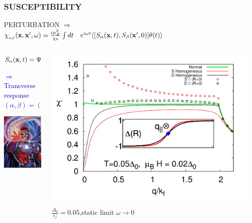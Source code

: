 \documentclass[amssymb,amsmath]{beamer}
\newcommand{\blue}{\textcolor{blue}}
\newcommand{\red}{\textcolor{red}}
\newcommand\Fontvi{\fontsize{9}{9}\selectfont}
\begin{document}
\begin{frame} \frametitle{SUSCEPTIBILITY} 
PERTURBATION $\Rightarrow\,\,$  \\
$\chi_{_{\alpha\beta}}({\bf x},{\bf x}',\omega) = \frac{i\mu_B^2}{\chi_0}\int dt \quad e^{i\omega t}\langle [S_\alpha({\bf x},t), S_\beta({\bf x}',0)]\theta(t) \rangle$
\begin{columns}
\begin{column}{0.42\textwidth}
$S_\alpha({\bf x},t) = \Psi^\dagger_\mu({\bf x},t) \sigma^{\alpha}_{\mu\nu}  \Psi^\dagger_\nu({\bf x},t)$

\blue{\Fontvi $\Rightarrow$Transverse response \\\hspace{1cm}$(\alpha,\beta) = (x,x)\, or\, (y,y)$} \\

{\fbox{\red{$\chi(\vR,\vq) = \int d\vr e^{-i\vq\cdot\vr} \chi(\vR,\vr)$}}}

\includegraphics[scale=0.373]{./figures/para_magneto.jpg}
\end{column}
\begin{column}{0.6\textwidth}
\centering
\includegraphics[scale=0.22]{./figures_3/fig_4/Fig4_2.png}\\
$\frac{\Delta_0}{\epsilon_f} = 0.05$,\quad static limit $\omega \rightarrow 0$
\end{column}
\end{columns}
\end{frame}
\end{document}

